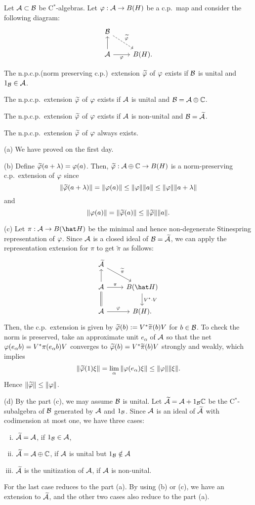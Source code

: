 \documentclass{../../small}
\begin{document}
\begin{thm}
Let $\mathcal{A}\subset\mathcal{B}$ be C$^*$-algebras.
Let $\varphi:\mathcal{A}\to B(H)$ be a c.p.~map and consider the following diagram:
\[\begin{tikzcd}
\cB\ar[dashed]{dr}{\tilde\f}&\\
\cA\ar{u}\ar[swap]{r}{\f}&B(H).
\end{tikzcd}\]
\begin{parts}
\item The n.p.c.p.(norm preserving c.p.)~extension $\widetilde{\varphi}$ of $\varphi$ exists if $\mathcal{B}$ is unital and $1_{\mathcal{B}}\in\mathcal{A}$.
\item The n.p.c.p.~extension $\widetilde{\varphi}$ of $\varphi$ exists if $\mathcal{A}$ is unital and $\mathcal{B}=\mathcal{A}\oplus\mathbb{C}$.
\item The n.p.c.p.~extension $\widetilde{\varphi}$ of $\varphi$ exists if $\mathcal{A}$ is non-unital and $\mathcal{B}=\widetilde{\mathcal{A}}$.
\item The n.p.c.p.~extension $\widetilde{\varphi}$ of $\varphi$ always exists.
\end{parts}
\end{thm}
\begin{pf}
(a) We have proved on the first day.

(b)
Define $\widetilde{\varphi}(a+\lambda)=\varphi(a)$.
Then, $\widetilde{\varphi}:\mathcal{A}\oplus\mathbb{C}\to B(H)$ is a norm-preserving c.p.~extension of $\varphi$ since
\[\|\widetilde{\varphi}(a+\lambda)\|=\|\varphi(a)\|\le\|\varphi\|\|a\|\le\|\varphi\|\|a+\lambda\|\]
and
\[\|\varphi(a)\|=\|\widetilde{\varphi}(a)\|\le\|\widetilde{\varphi}\|\|a\|.\]

(c)
Let $\pi:\cA\to B(\hat H)$ be the minimal and hence non-degenerate Stinespring representation of $\varphi$.
Since $\mathcal{A}$ is a closed ideal of $\mathcal{B}=\widetilde{\mathcal{A}}$, we can apply the representation extension for $\pi$ to get $\tilde\pi$ as follows:
\[\begin{tikzcd}
\tilde\cA\ar{dr}{\tilde\pi}&\\
\cA\ar{u}\ar{r}{\pi}&B(\hat H)\ar{d}{V^*\cdot V}\\
\cA\ar[equal]{u}\ar{r}{\f}&B(H).
\end{tikzcd}\]
Then, the c.p.~extension is given by $\widetilde{\varphi}(b):=V^*\widetilde\pi(b)V$ for $b\in\mathcal{B}$.
To check the norm is preserved, take an approximate unit $e_\alpha$ of $\mathcal{A}$ so that the net $\varphi(e_\alpha b)=V^*\pi(e_\alpha b)V$ converges to $\widetilde{\varphi}(b)=V^*\widetilde\pi(b)V$ strongly and weakly, which implies
\[\|\widetilde{\varphi}(1)\xi\|=\lim_\alpha\|\varphi(e_\alpha)\xi\|\le\|\varphi\|\|\xi\|.\]
Hence $\|\widetilde{\varphi}\|\le\|\varphi\|$.

(d)
By the part (c), we may assume $\mathcal{B}$ is unital.
Let $\widetilde{\mathcal{A}}=\mathcal{A}+1_{\mathcal{B}}\mathbb{C}$ be the C$^*$-subalgebra of $\mathcal{B}$ generated by $\mathcal{A}$ and $1_{\mathcal{B}}$.
Since $\mathcal{A}$ is an ideal of $\widetilde{\mathcal{A}}$ with codimension at most one, we have three cases:
\begin{enumerate}[(i)]
\item $\widetilde{\mathcal{A}}=\mathcal{A}$, if $1_{\mathcal{B}}\in\mathcal{A}$,
\item $\widetilde{\mathcal{A}}=\mathcal{A}\oplus\mathbb{C}$, if $\mathcal{A}$ is unital but $1_{\mathcal{B}}\notin\mathcal{A}$
\item $\widetilde{\mathcal{A}}$ is the unitization of $\mathcal{A}$, if $\mathcal{A}$ is non-unital.
\end{enumerate}
For the last case reduces to the part (a). 
By using (b) or (c), we have an extension to $\widetilde{\mathcal{A}}$, and the other two cases also reduce to the part (a).
\end{pf}
\end{document}
